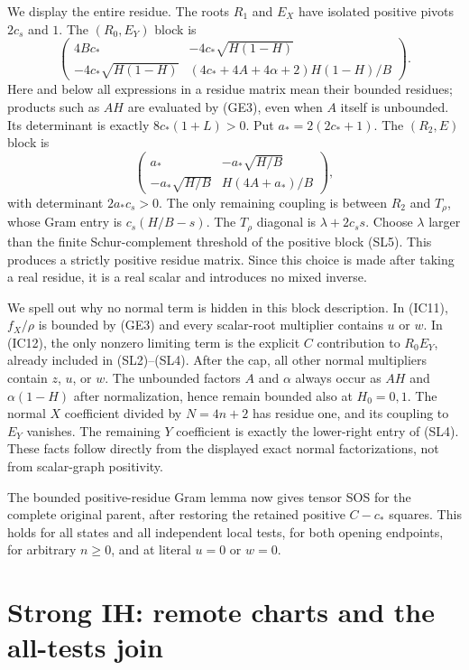 We display the entire residue. The roots $R_1$ and $E_X$ have isolated
positive pivots $2c_s$ and $1$. The $(R_0,E_Y)$ block is
\[
 \begin{pmatrix}
 4Bc_*&-4c_*\sqrt{H(1-H)}\\
 -4c_*\sqrt{H(1-H)}&
 (4c_*+4A+4\alpha+2)H(1-H)/B
 \end{pmatrix}.
\tag{SL4}
\]
Here and below all expressions in a residue matrix mean their bounded
residues; products such as $AH$ are evaluated by (GE3), even when
$A$ itself is unbounded. Its determinant is exactly $8c_*(1+L)>0$.
Put $a_*=2(2c_*+1)$. The $(R_2,E)$ block is
\[
 \begin{pmatrix}
 a_*&-a_*\sqrt{H/B}\\
 -a_*\sqrt{H/B}&H(4A+a_*)/B
 \end{pmatrix},
\tag{SL5}
\]
with determinant $2a_*c_s>0$. The only remaining coupling is between
$R_2$ and $T_\rho$, whose Gram entry is
$c_s(H/B-s)$. The $T_\rho$ diagonal is $\lambda+2c_s s$.
Choose $\lambda$ larger than the finite Schur-complement threshold
of the positive block (SL5). This produces a strictly positive
residue matrix. Since this choice is made after taking a real
residue, it is a real scalar and introduces no mixed inverse.

We spell out why no normal term is hidden in this block description.
In (IC11), $f_X/\rho$ is bounded by (GE3) and every scalar-root
multiplier contains $u$ or $w$. In (IC12), the only nonzero limiting
term is the explicit $C$ contribution to $R_0E_Y$, already included
in (SL2)--(SL4). After the cap, all other normal multipliers contain
$z$, $u$, or $w$. The unbounded factors $A$ and $\alpha$ always occur
as $AH$ and $\alpha(1-H)$ after normalization, hence remain bounded
also at $H_0=0,1$. The normal $X$ coefficient divided by $N=4n+2$
has residue one, and its coupling to $E_Y$ vanishes. The remaining
$Y$ coefficient is exactly the lower-right entry of (SL4).
These facts follow directly from the displayed exact normal
factorizations, not from scalar-graph positivity.

The bounded positive-residue Gram lemma now gives tensor SOS for the
complete original parent, after restoring the retained positive
$C-c_*$ squares. This holds for all states and all independent local
tests, for both opening endpoints, for arbitrary $n\ge0$, and at
literal $u=0$ or $w=0$.


\section{\texorpdfstring{Strong IH: remote charts and the all-tests join}{Strong IH: remote charts and the all-tests join}}
\label{component:p7405dbf89341}


